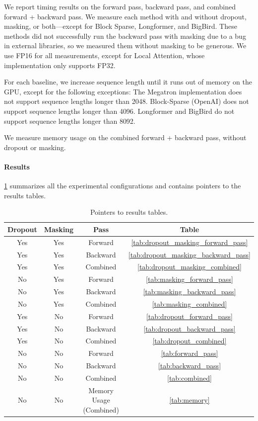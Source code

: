 \documentclass{article}
\begin{document}
We report timing results on the forward pass, backward pass, and combined forward + backward pass.
We measure each method with and without dropout, masking, or both---except for Block Sparse, Longformer, and BigBird.
These methods did not successfully run the backward pass with masking due to a bug in external libraries, so we measured them without masking to be generous.
We use FP16 for all measurements, except for Local Attention, whose
implementation only supports FP32.

For each baseline, we increase sequence length until it runs out of memory on the GPU, except for the following exceptions:
The Megatron implementation does not support sequence lengths longer than 2048.
Block-Sparse (OpenAI) does not support sequence lengths longer than 4096.
Longformer and BigBird do not support sequence lengths longer than 8092.

We measure memory usage on the combined forward + backward pass, without dropout or masking.

\paragraph{Results}
\cref{tab:benchmark_summary} summarizes all the experimental configurations and contains pointers to the results tables.

\begin{table}
    \centering
    \caption{Pointers to results tables.}
    \label{tab:benchmark_summary}
    \begin{tabular}{ccc|c}
    \toprule
        \textbf{Dropout} & \textbf{Masking} & \textbf{Pass} & \textbf{Table} \\ \hline
        Yes & Yes & Forward & \cref{tab:dropout_masking_forward_pass} \\
        Yes & Yes & Backward & \cref{tab:dropout_masking_backward_pass} \\
        Yes & Yes & Combined & \cref{tab:dropout_masking_combined} \\
        No & Yes & Forward  & \cref{tab:masking_forward_pass} \\
        No & Yes & Backward & \cref{tab:masking_backward_pass} \\
        No & Yes & Combined & \cref{tab:masking_combined} \\
        Yes & No & Forward  & \cref{tab:dropout_forward_pass} \\
        Yes & No & Backward & \cref{tab:dropout_backward_pass} \\
        Yes & No & Combined & \cref{tab:dropout_combined} \\
        No & No & Forward  & \cref{tab:forward_pass} \\
        No & No & Backward & \cref{tab:backward_pass} \\
        No & No & Combined & \cref{tab:combined} \\
        No & No & Memory Usage (Combined) & \cref{tab:memory} \\
        \toprule
    \end{tabular}
\end{table}
\end{document}
